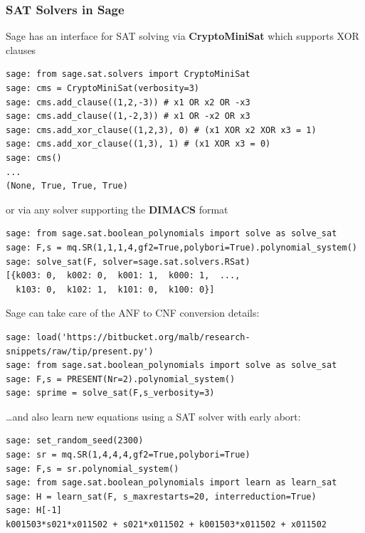 \documentclass[9pt]{beamer}
\begin{document}
\begin{frame}
\frametitle{SAT Solvers in Sage}
Sage has an interface for SAT solving via \textbf{CryptoMiniSat} which supports XOR clauses\\

\begin{lstlisting}
sage: from sage.sat.solvers import CryptoMiniSat 
sage: cms = CryptoMiniSat(verbosity=3)
sage: cms.add_clause((1,2,-3)) # x1 OR x2 OR -x3
sage: cms.add_clause((1,-2,3)) # x1 OR -x2 OR x3 
sage: cms.add_xor_clause((1,2,3), 0) # (x1 XOR x2 XOR x3 = 1)
sage: cms.add_xor_clause((1,3), 1) # (x1 XOR x3 = 0)
sage: cms()
...
(None, True, True, True)
\end{lstlisting}

or via any solver supporting the \textbf{DIMACS} format\\
\begin{lstlisting}
sage: from sage.sat.boolean_polynomials import solve as solve_sat
sage: F,s = mq.SR(1,1,1,4,gf2=True,polybori=True).polynomial_system()
sage: solve_sat(F, solver=sage.sat.solvers.RSat)
[{k003: 0,  k002: 0,  k001: 1,  k000: 1,  ..., 
  k103: 0,  k102: 1,  k101: 0,  k100: 0}]
\end{lstlisting}

\framebreak

Sage can take care of the ANF to CNF conversion details:

\begin{lstlisting}
sage: load('https://bitbucket.org/malb/research-snippets/raw/tip/present.py')
sage: from sage.sat.boolean_polynomials import solve as solve_sat
sage: F,s = PRESENT(Nr=2).polynomial_system()                    
sage: sprime = solve_sat(F,s_verbosity=3)
\end{lstlisting}

\dots and also learn new equations using a SAT solver with early abort:

\begin{lstlisting}
sage: set_random_seed(2300)
sage: sr = mq.SR(1,4,4,4,gf2=True,polybori=True)
sage: F,s = sr.polynomial_system()
sage: from sage.sat.boolean_polynomials import learn as learn_sat
sage: H = learn_sat(F, s_maxrestarts=20, interreduction=True)
sage: H[-1]
k001503*s021*x011502 + s021*x011502 + k001503*x011502 + x011502
\end{lstlisting}
\end{frame}
\end{document}
